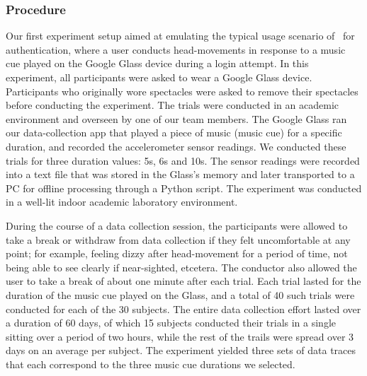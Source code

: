 \subsubsection{Procedure}
Our first experiment setup aimed at emulating the typical usage scenario
of \systemname~for authentication, where a user conducts head-movements in
response to a music cue played on the Google Glass device during a login
attempt.
In this experiment, all participants were asked to wear a Google Glass
device. Participants who originally wore spectacles were asked to remove their
spectacles before conducting the experiment.
The trials were conducted in an academic environment and overseen by one of
our team members.
The Google Glass ran our data-collection app that played a piece of
music (music cue) for a specific duration, and recorded the accelerometer
sensor readings. We conducted these trials for three duration values: 5s,
6s and 10s. %
The sensor readings were recorded into a text file that was stored
in the Glass's memory and later transported to a PC for offline processing
through a Python script. The experiment was conducted in a well-lit indoor
academic laboratory environment.

During the course of a data collection session, the participants were allowed to take a
break or withdraw from data collection if they felt uncomfortable at any
point; for example, feeling
dizzy after head-movement for a period of time, not being able to see clearly
if near-sighted, etcetera. The conductor also allowed the user to take a break
of about one minute after each trial.
Each trial lasted for the duration of the music cue played on the Glass, and
a total of 40 such trials were conducted for each of the 30 subjects.
The entire data collection effort lasted over a duration of 60 days, of which 15
subjects conducted their trials in a single sitting over a period of two
hours, while the rest of the trails were spread over 3 days on an average per
subject.
The experiment yielded three sets of data traces that each correspond to
the three music cue durations we selected.

